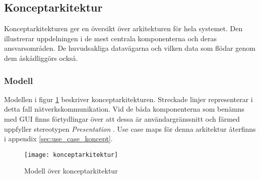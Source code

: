 \subsection{Konceptarkitektur}
Konceptarkitekturen ger en översikt över arkitekturen för hela systemet. Den illustrerar uppdelningen i de mest centrala komponenterna och deras ansvarsområden. De huvudsakliga datavägarna och vilken data som flödar genom dem åskådliggörs också.

\subsubsection{Modell}
Modellen i figur \ref{fig:konceptarkitektur} beskriver konceptarkitekturen. Streckade linjer representerar i detta fall nätverkskommunikation. Vid de båda komponenterna som benämns med GUI finns förtydlingar över att dessa är användargränssnitt och färmed uppfyller stereotypen \textit{Presentation} \cite[p.~50--51]{bib-architecture-primer}. Use case maps för denna arkitektur återfinns i appendix \ref{sec:use_case_koncept}.

\begin{figure}[h]
    \centering
    \texttt{[image: konceptarkitektur]}
    \caption{Modell över konceptarkitektur}
    \label{fig:konceptarkitektur}
\end{figure}

